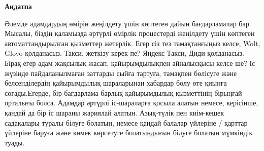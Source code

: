 \newpage
\pagestyle{plain}

{
\begin{center}
    \Large
    \textbf{Аңдатпа}
\end{center}
Әлемде адамдардың өмірін жеңілдету үшін көптеген дайын бағдарламалар бар. Мысалы, біздің қаламызда әртүрлі өмірлік процестерді жеңілдету үшін көптеген автоматтандырылған қызметтер жетерлік. Егер сіз тез тамақтанғыңыз келсе, Wolt, Glovo қолданасыз. Такси, жеткізу керек пе? Яндекс Такси, Диди қолданасыз. Бірақ егер адам жақсылық жасап, қайырымдылықпен айналысқысы келсе ше? Іс жүзінде пайдаланылмаған заттарды сыйға тартуға, тамақпен бөлісуге және белсенділердің қайырымдылық шараларынан хабардар болу өте қиынға соғады.Егерде, бір бағдарлама барлық қайырымдылық қызметтінің бірыңғай орталығы болса. Адамдар әртүрлі іс-шараларға қосыла алатын немесе, керісінше, қандай да бір іс шараны жариялай алатын. Азық-түлік пен киім-кешек садақалары туралы білуге болатын, немесе қандай балалар үйлеріне / қарттар үйлеріне баруға және көмек көрсетуге болатындығын білуге болатын мүмкіндік туады.
}